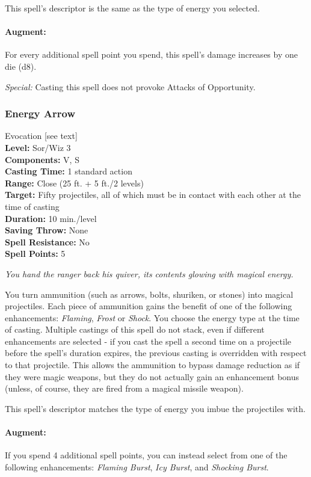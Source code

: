 This spell's descriptor is the same as the type of energy you selected. 

\paragraph{Augment:} For every additional spell point you spend, this spell's damage increases by one die (d8).

\emph{Special:} Casting this spell does not provoke Attacks of Opportunity.


\subsubsection{Energy Arrow}
\label{Spell:EnergyArrow}
Evocation [see text]
\\ \textbf{Level:} Sor/Wiz 3
\\ \textbf{Components:} V, S
\\ \textbf{Casting Time:} 1 standard action
\\ \textbf{Range:} Close (25 ft. + 5 ft./2 levels)
\\ \textbf{Target:} Fifty projectiles, all of which must be in contact with each other at the time of casting
\\ \textbf{Duration:} 10 min./level
\\ \textbf{Saving Throw:} None
\\ \textbf{Spell Resistance:} No
\\ \textbf{Spell Points:} 5

\emph{You hand the ranger back his quiver, its contents glowing with magical energy.}

You turn ammunition (such as arrows, bolts, shuriken, or stones) into magical projectiles. 
Each piece of ammunition gains the benefit of one of the following enhancements:
\emph{Flaming}, \emph{Frost} or \emph{Shock}.
You choose the energy type at the time of casting.
Multiple castings of this spell do not stack, even if different enhancements are selected - 
if you cast the spell a second time on a projectile
before the spell's duration expires, the previous casting is overridden with respect to that projectile.
This allows the ammunition to bypass damage reduction as
if they were magic weapons, but they do not actually gain an enhancement bonus
(unless, of course, they are fired from a magical missile weapon).

This spell's descriptor matches the type of energy you imbue the projectiles with.

\paragraph{Augment:} If you spend 4 additional spell points, 
you can instead select from one of the following enhancements:
\emph{Flaming Burst}, \emph{Icy Burst}, and \emph{Shocking Burst}.

